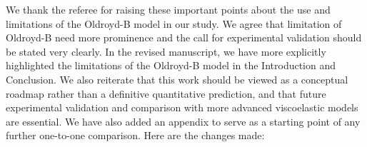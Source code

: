\documentclass[]{article}
\newcommand{\vsy}[1]{\todo[color=orange, bordercolor=none, textcolor=white]{Vatsal}\textcolor{orange}{#1}}
\begin{document}
\begin{enumerate}
\begin{enumerate}
\begin{itemize}

     \end{itemize}

     We thank the referee for raising these important points about the use and limitations of the Oldroyd-B model in our study. We agree that limitation of Oldroyd-B need more prominence and the call for experimental validation should be stated very clearly. In the revised manuscript, we have more explicitly highlighted the limitations of the Oldroyd-B model in the Introduction and Conclusion. We also reiterate that this work should be viewed as a conceptual roadmap rather than a definitive quantitative prediction, and that future experimental validation and comparison with more advanced viscoelastic models are essential. We have also added an appendix to serve as a starting point of any further one-to-one comparison. Here are the changes made: 



\end{enumerate}
\end{enumerate}
\end{document}
